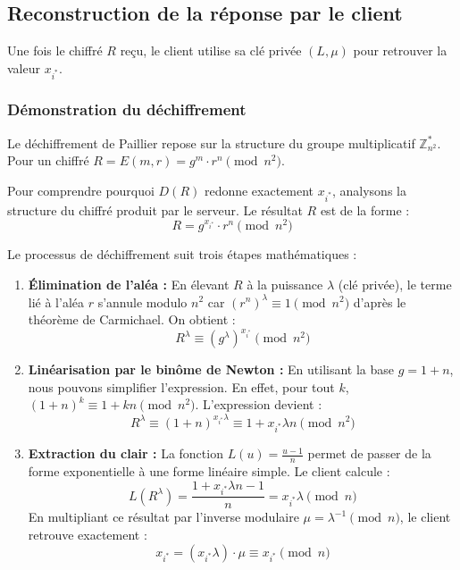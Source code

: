 \documentclass[12pt,a4paper]{report}
\begin{document}
\subsection{Reconstruction de la réponse par le client}

Une fois le chiffré $R$ reçu, le client utilise sa clé privée $(L, \mu)$ pour retrouver la valeur $x_{i^*}$.

\subsubsection{Démonstration du déchiffrement}
Le déchiffrement de Paillier repose sur la structure du groupe multiplicatif $\mathbb{Z}_{n^2}^*$. Pour un chiffré $R = E(m, r) = g^m \cdot r^n \pmod{n^2}$.



Pour comprendre pourquoi $D(R)$ redonne exactement $x_{i^*}$, analysons la structure du chiffré produit par le serveur. Le résultat $R$ est de la forme :
\[ R = g^{x_{i^*}} \cdot r^n \pmod{n^2} \]

Le processus de déchiffrement suit trois étapes mathématiques :

\begin{enumerate}
    \item \textbf{Élimination de l'aléa :} En élevant $R$ à la puissance $\lambda$ (clé privée), le terme lié à l'aléa $r$ s'annule modulo $n^2$ car $(r^n)^\lambda \equiv 1 \pmod{n^2}$ d'après le théorème de Carmichael. On obtient :
    \[ R^\lambda \equiv (g^\lambda)^{x_{i^*}} \pmod{n^2} \]
    
    \item \textbf{Linéarisation par le binôme de Newton :} En utilisant la base $g = 1+n$, nous pouvons simplifier l'expression. En effet, pour tout $k$, $(1+n)^k \equiv 1 + kn \pmod{n^2}$. L'expression devient :
    \[ R^\lambda \equiv (1+n)^{x_{i^*}\lambda} \equiv 1 + x_{i^*} \lambda n \pmod{n^2} \]
    
    \item \textbf{Extraction du clair :} La fonction $L(u) = \frac{u-1}{n}$ permet de passer de la forme exponentielle à une forme linéaire simple. Le client calcule :
    \[ L(R^\lambda) = \frac{1 + x_{i^*} \lambda n - 1}{n} = x_{i^*} \lambda \pmod{n} \]
    En multipliant ce résultat par l'inverse modulaire $\mu = \lambda^{-1} \pmod{n}$, le client retrouve exactement :
    \[ x_{i^*} = (x_{i^*} \lambda) \cdot \mu \equiv x_{i^*} \pmod{n} \]
\end{enumerate}
\end{document}
